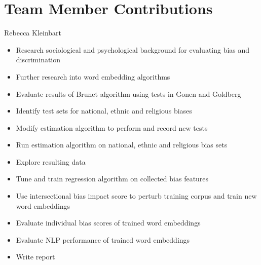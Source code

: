\documentclass{article}
\begin{document}
\pagebreak[2]

\section{Team Member Contributions}

Rebecca Kleinbart
\begin{itemize}
    \item Research sociological and psychological background for
        evaluating bias and discrimination
    \item Further research into word embedding algorithms
    \item Evaluate results of Brunet algorithm using tests
        in Gonen and Goldberg\cite{gonen_lipstick_2019}
    \item Identify test sets for national, ethnic and religious biases
    \item Modify estimation algorithm to perform and record new tests
    \item Run estimation algorithm on national, ethnic and religious
        bias sets
    \item Explore resulting data
    \item Tune and train regression algorithm on collected bias features
    \item Use intersectional bias impact score to perturb training
        corpus and train new word embeddings
    \item Evaluate individual bias scores of trained word embeddings
    \item Evaluate NLP performance of trained word embeddings
    \item Write report
\end{itemize}
\end{document}
